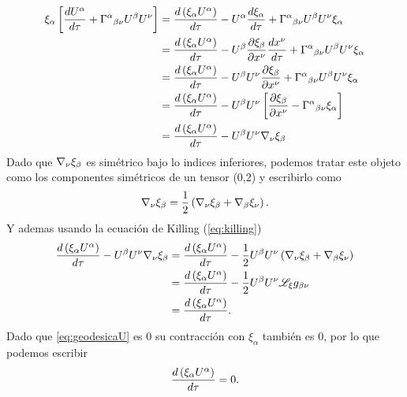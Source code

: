 \begin{equation}
\begin{aligned}
    \xi_\alpha\left[\frac{d U^\alpha}{d \tau}+\Gamma^\alpha{ }_{\beta \nu} U^\beta U^\nu\right] & = \frac{d \left(\xi_\alpha U^\alpha\right)}{d  \tau}-U^\alpha \frac{d \xi_\alpha}{d \tau}+\Gamma^\alpha{ }_{\beta \nu} U^\beta U^\nu \xi_\alpha \\
    & = \frac{d \left(\xi_\alpha U^\alpha\right)}{d  \tau} - U^\beta \frac{\partial \xi_\beta}{\partial x^\nu} \frac{d x^\nu}{d \tau} + \Gamma^\alpha{ }_{\beta \nu} U^\beta U^\nu \xi_\alpha \\
    & = \frac{d \left(\xi_\alpha U^\alpha\right)}{d  \tau} - U^\beta U^\nu \frac{\partial \xi_\beta}{\partial x^\nu} + \Gamma^\alpha{ }_{\beta \nu} U^\beta U^\nu \xi_\alpha\\
    & = \frac{d \left(\xi_\alpha U^\alpha\right)}{d  \tau} - U^\beta U^\nu \left[ \frac{\partial \xi_\beta}{\partial x^\nu} - \Gamma^\alpha{ }_{\beta \nu}  \xi_\alpha \right]\\ 
    & = \frac{d \left(\xi_\alpha U^\alpha\right)}{d  \tau} - U^\beta U^\nu \mathbf{\nabla}_\nu \xi_\beta \\
\end{aligned}    
\end{equation}
Dado que $\mathbf{\nabla}_\nu \xi_\beta $ es simétrico bajo lo indices inferiores, podemos tratar este objeto como los componentes simétricos de un tensor (0,2) y escribirlo como
\[
    \mathbf{\nabla}_\nu \xi_\beta = \frac{1}{2} \left( \mathbf{\nabla}_\nu \xi_\beta + \mathbf{\nabla}_\beta \xi_\nu \right).
\]
Y ademas usando la ecuación de Killing (\ref{eq:killing}) 
\begin{equation}
\begin{aligned}
    \frac{d \left(\xi_\alpha U^\alpha\right)}{d  \tau} - U^\beta U^\nu \mathbf{\nabla}_\nu \xi_\beta & = \frac{d \left(\xi_\alpha U^\alpha\right)}{d  \tau} - \frac{1}{2}U^\beta U^\nu  \left( \mathbf{\nabla}_\nu \xi_\beta + \mathbf{\nabla}_\beta \xi_\nu \right)\\
    & = \frac{d \left(\xi_\alpha U^\alpha\right)}{d  \tau} - \frac{1}{2}U^\beta U^\nu \mathscr{L}_\xi g_{\beta \nu} \\
    & = \frac{d \left(\xi_\alpha U^\alpha\right)}{d  \tau}.
\end{aligned}    
\end{equation}
Dado que \ref{eq:geodesicaU} es $0$ su contracción con $\xi_\alpha$ también es $0$, por lo que podemos escribir
\begin{equation}
    \frac{d \left(\xi_\alpha U^\alpha\right)}{d  \tau} = 0.
\end{equation}

